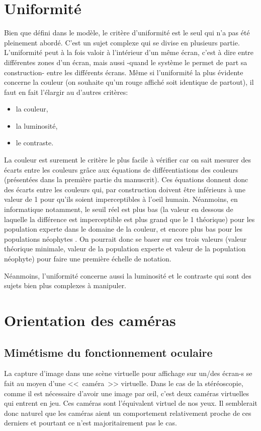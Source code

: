 	\section{Uniformité}
	\par Bien que défini dans le modèle, le critère d'uniformité est le seul qui n'a pas été pleinement abordé. C'est un sujet complexe qui se divise en plusieurs partie. L'uniformité peut à la fois valoir à l'intérieur d'un même écran, c'est à dire entre différentes zones d'un écran, mais aussi -quand le système le permet de part sa construction- entre les différents écrans. Même si l'uniformité la plus évidente concerne la couleur (on souhaite qu'un rouge affiché soit identique de partout), il faut en fait l'élargir au d'autres critères:
	\begin{itemize}
		\item la couleur,
		\item la luminosité,
		\item le contraste.
	\end{itemize}
	
	\par La couleur est surement le critère le plus facile à vérifier car on sait mesurer des écarts entre les couleurs grâce aux équations de différentiations des couleurs (présentées dans la première partie du manuscrit). Ces équations donnent donc des écarts entre les couleurs qui, par construction doivent être inférieurs à une valeur de 1 pour qu'ils soient imperceptibles à l'oeil humain. Néanmoins, en informatique notamment, le seuil réel est plus bas (la valeur en dessous de laquelle la différence est imperceptible est plus grand que le 1 théorique) pour les population experte dans le domaine de la couleur, et encore plus bas pour les populations néophytes \citep{vidal_color-difference_2016}. On pourrait donc se baser sur ces trois valeurs (valeur théorique minimale, valeur de la population experte et valeur de la population néophyte) pour faire une première échelle de notation.
	
	\par Néanmoins, l'uniformité concerne aussi la luminosité et le contraste qui sont des sujets bien plus complexes à manipuler.
	
	\section{Orientation des caméras}	
	\subsection{Mimétisme du fonctionnement oculaire}	
	\par La capture d'image dans une scène virtuelle pour affichage sur un/des écran-s se fait au moyen d'une <<~caméra~>> virtuelle. Dans le cas de la stéréoscopie, comme il est nécessaire d'avoir une image par œil, c'est deux caméras virtuelles qui entrent en jeu. Ces caméras sont l'équivalent virtuel de nos yeux. Il semblerait donc naturel que les caméras aient un comportement relativement proche de ces derniers et pourtant ce n'est majoritairement pas le cas.
	
